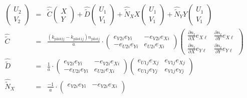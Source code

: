 \documentclass[12pt,a4paper,twoside,openright,BCOR10mm,headsepline,titlepage,abstracton,chapterprefix,final]{scrreprt}
\newcommand\wavenumber{k}
\newcommand\pilot{\textrm{pilot}}
\begin{document}
\begin{eqnarray}
 \begin{pmatrix}  
   U_2 \\ V_2  
 \end{pmatrix}
 &=&
    \hat{\tilde{C}}
  \begin{pmatrix}
     X \\ Y    
  \end{pmatrix}  
  +
  \hat{\tilde{D}}
  \begin{pmatrix}
   U_1 \\ V_1
  \end{pmatrix}
  +
  \hat{\tilde{N}}_X X
  \begin{pmatrix}
   U_1 \\ V_1
  \end{pmatrix}
  +
  \hat{\tilde{N}}_Y Y
  \begin{pmatrix}
   U_1 \\ V_1
  \end{pmatrix}
  \\
  \hat{\tilde{C}} 
  &=&
     \frac{  (\wavenumber_{\pilot 2 j} - \wavenumber_{\pilot 1 j}) n_{\pilot j}}{ a }
     \cdot
     \begin{pmatrix}
       e_{V2i} e_{Yi} & -e_{V2i} e_{Xi}
       \\
      -e_{U2i} e_{Yi}  & e_{U2i} e_{Xi}
     \end{pmatrix}
     \begin{pmatrix}
       \frac{\partial n_\ell}{\partial X} e_{X\ell} & \frac{\partial n_\ell}{\partial Y} e_{X\ell} 
       \\    
       \frac{\partial n_\ell}{\partial X} e_{Y\ell} & \frac{\partial n_\ell}{\partial Y} e_{Y\ell}
     \end{pmatrix} 
  \\
  \hat{\tilde{D}}
  &=&
     \frac{ 1 }{ a }
     \cdot
     \begin{pmatrix}
       e_{V2i} e_{Yi} & -e_{V2i} e_{Xi}
       \\
      -e_{U2i} e_{Yi}  & e_{U2i} e_{Xi}
     \end{pmatrix}
     \begin{pmatrix}
       e_{U1j} e_{Xj} &  e_{V1j} e_{Xj}
       \\
       e_{U1j} e_{Yj} &  e_{V1j} e_{Yj}
     \end{pmatrix}
  \\
  \hat{\tilde{N}}_X
  &=&
     \frac{ -1 }{ a }
     \cdot
     \begin{pmatrix}
       e_{V2i} e_{Yi} & -e_{V2i} e_{Xi}
       \\

\end{pmatrix}
\end{eqnarray}
\end{document}
